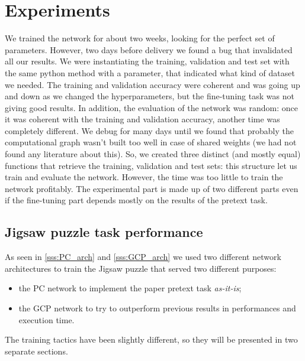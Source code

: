 \section{Experiments}\label{s:experiments}
We trained the network for about two weeks, looking for the perfect set of parameters. However, two days before delivery we found a bug that invalidated all our results. We were instantiating the training, validation and test set with the same python method with a parameter, that indicated what kind of dataset we needed. The training and validation accuracy were coherent and was going up and down as we changed the hyperparameters, but the fine-tuning task was not giving good results. In addition, the evaluation of the network was random: once it was coherent with the training and validation accuracy, another time was completely different. We debug for many days until we found that probably the computational graph wasn't built too well in case of shared weights (we had not found any literature about this). So, we created three distinct (and mostly equal) functions that retrieve the training, validation and test sets: this structure let us train and evaluate the network. However, the time was too little to train the network profitably.\newline
The experimental part is made up of two different parts even if the fine-tuning part depends mostly on the results of the pretext task. 


\subsection{Jigsaw puzzle task performance}
As seen in \ref{sss:PC_arch} and \ref{sss:GCP_arch} we used two different network architectures to train the Jigsaw puzzle that served two different purposes:
\begin{itemize}
    \item the PC network to implement the paper pretext task \emph{as-it-is};
    \item the GCP network to try to outperform previous results in performances and execution time.
\end{itemize}
The training tactics have been slightly different, so they will be presented in two separate sections.


